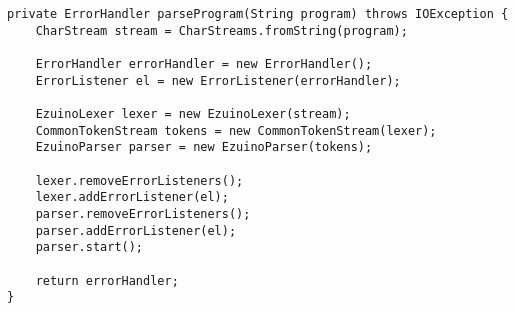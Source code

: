 \begin{lstlisting}[caption={Private function to run a test program}, label={test1}]
private ErrorHandler parseProgram(String program) throws IOException {
    CharStream stream = CharStreams.fromString(program);

    ErrorHandler errorHandler = new ErrorHandler();
    ErrorListener el = new ErrorListener(errorHandler);

    EzuinoLexer lexer = new EzuinoLexer(stream);
    CommonTokenStream tokens = new CommonTokenStream(lexer);
    EzuinoParser parser = new EzuinoParser(tokens);

    lexer.removeErrorListeners();
    lexer.addErrorListener(el);
    parser.removeErrorListeners();
    parser.addErrorListener(el);
    parser.start();

    return errorHandler;
}
\end{lstlisting}